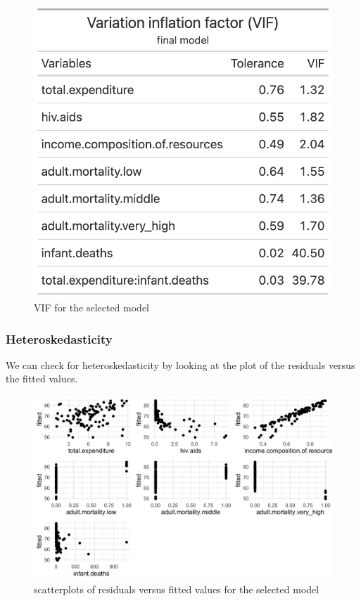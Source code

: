 \begin{figure}[H]
	\centering
	\includegraphics{figures/vif_final_model.png}
	\caption{VIF for the selected model}
	\label{<label>}
\end{figure}

\subsubsection{Heteroskedasticity}

We can check for heteroskedasticity by looking at the plot of the residuals versus the fitted values.


\begin{figure}[H]
	\centering
	\includegraphics{figures/residuals_vs_fitted.png}
	\caption{scatterplots of residuals versus fitted values for the selected model}
	\label{fig:residuals_vs_fitted}
\end{figure}

